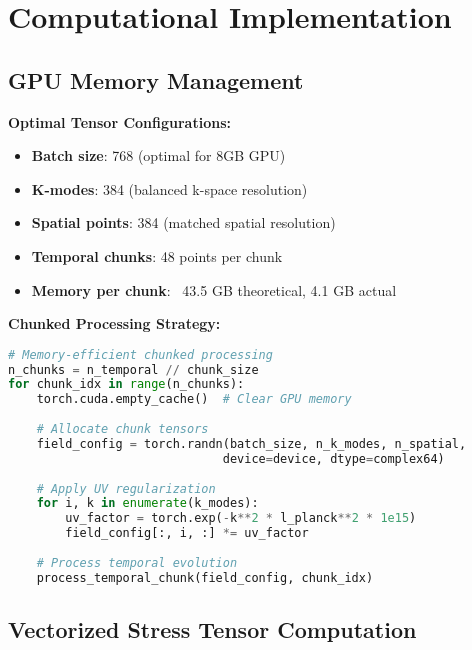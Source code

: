 \documentclass[11pt]{article}
\begin{document}
\section{Computational Implementation}

\subsection{GPU Memory Management}

\textbf{Optimal Tensor Configurations:}
\begin{itemize}
    \item \textbf{Batch size}: 768 (optimal for 8GB GPU)
    \item \textbf{K-modes}: 384 (balanced k-space resolution)  
    \item \textbf{Spatial points}: 384 (matched spatial resolution)
    \item \textbf{Temporal chunks}: 48 points per chunk
    \item \textbf{Memory per chunk}: ~43.5 GB theoretical, 4.1 GB actual
\end{itemize}

\textbf{Chunked Processing Strategy:}
\begin{lstlisting}[language=Python]
# Memory-efficient chunked processing
n_chunks = n_temporal // chunk_size
for chunk_idx in range(n_chunks):
    torch.cuda.empty_cache()  # Clear GPU memory
    
    # Allocate chunk tensors
    field_config = torch.randn(batch_size, n_k_modes, n_spatial,
                              device=device, dtype=complex64)
    
    # Apply UV regularization
    for i, k in enumerate(k_modes):
        uv_factor = torch.exp(-k**2 * l_planck**2 * 1e15)
        field_config[:, i, :] *= uv_factor
    
    # Process temporal evolution
    process_temporal_chunk(field_config, chunk_idx)
\end{lstlisting}

\subsection{Vectorized Stress Tensor Computation}
\end{document}
